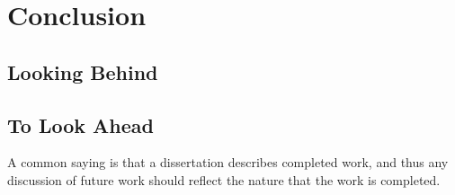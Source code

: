 
\chapter{Conclusion}\label{ch:conclusion}

\section{Looking Behind}

\section{To Look Ahead}

A common saying is that a dissertation describes completed work, and thus any discussion of future work should reflect
the nature that the work is completed.


